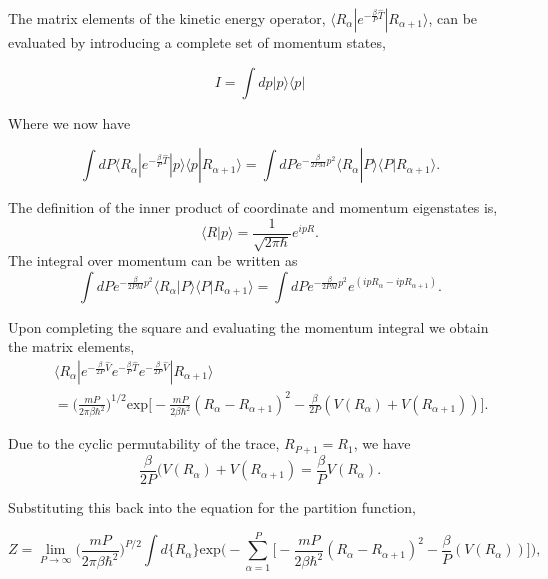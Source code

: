 \documentclass[phd,tocprelim]{cornell}
\begin{document}
The matrix elements of the kinetic energy operator, $\langle R _{\alpha} |  e^{-\frac{\beta}{P}\hat{T}}|R_{\alpha+1} \rangle$, can be evaluated by introducing a complete set of momentum states, 

\begin{equation}
I = \int dp |p \rangle\langle p | 
\end{equation}

Where we now have

\begin{equation}
\int dP \langle R _{\alpha} |e^{-\frac{\beta}{P}\hat{T}}|p \rangle\langle p |R_{\alpha+1} \rangle=\int dP  e^{-\frac{\beta}{2PM}p^2}\langle R _{\alpha} |P \rangle\langle P |R_{\alpha+1} \rangle.
\end{equation}

The definition of the inner product of coordinate and momentum eigenstates is,
\begin{equation} 
\langle R| p\rangle = \frac{1}{\sqrt{2 \pi \hbar}} e^{i p R}.
\end{equation}
The integral over momentum can be written as
\begin{equation} 
\int dP  e^{-\frac{\beta}{2PM}p^2}\langle R _{\alpha} |P \rangle\langle P |R_{\alpha+1} \rangle=
\int dP  e^{-\frac{\beta}{2PM}p^2} e^{(ipR_{\alpha}- ipR_{\alpha+1})}.
\end{equation}

Upon completing the square and evaluating the momentum integral we obtain the matrix elements, 
\begin{eqnarray}
&&\langle R_{\alpha} | e^{ -\frac{\beta}{2P}\hat{V}} e^{-\frac{\beta}{P}\hat{T}} e^{ -\frac{\beta}{2P}\hat{V}} | R_{\alpha+1} \rangle 
 \\ 
\nonumber
&&= \bigg( \frac{mP}{2 \pi \beta {\hbar}^2} \bigg)^{1/2} 
\textrm{exp} 
\bigg[-\frac{mP}{2 \beta {\hbar}^2} ( R_{\alpha} - R_{\alpha+1})^2 -\frac{\beta}{2P}( V(R_{\alpha}) +V(R_{\alpha+1})) \bigg].
\end{eqnarray}

Due to the cyclic permutability of the trace, $R_{P+1} =R_1$, we have
\begin{equation}
\frac{\beta}{2P}( V(R_{\alpha}) +V(R_{\alpha+1}) = \frac{\beta}{P} V(R_{\alpha}).
\end{equation}

Substituting this back into the equation for the partition function,

\begin{equation}
Z= \lim_{P \to \infty}\bigg( \frac{mP}{2 \pi \beta {\hbar}^2} \bigg)^{P/2} \int d\{R_{\alpha}\} 
\textrm{exp}\bigg(-\sum_{\alpha=1}^P \bigg[-\frac{mP}{2 \beta {\hbar}^2} ( R_{\alpha} - R_{\alpha+1})^2 -\frac{\beta}{P}( V(R_{\alpha})) \bigg] \bigg),
\end{equation}
\end{document}
